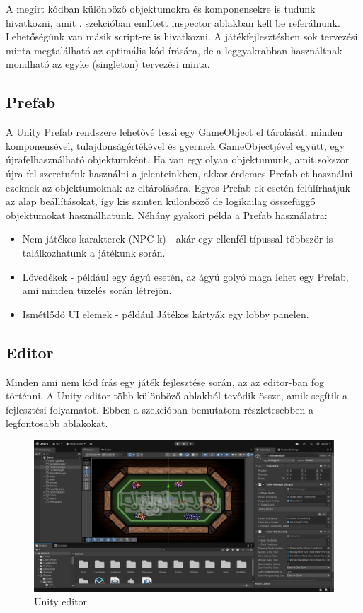 \documentclass[]{thesis-ekf}
\theoremstyle{definition}
\theoremstyle{remark}
\begin{document}
A megírt kódban különböző objektumokra és komponensekre is tudunk hivatkozni, amit . szekcióban említett inspector ablakban kell be referálnunk. Lehetőségünk van másik script-re is hivatkozni. A játékfejlesztésben sok tervezési minta megtalálható az optimális kód írására, de a leggyakrabban használtnak mondható az egyke (singleton) tervezési minta. \cite{UnityScripting}

\subsection{Prefab}
A Unity Prefab rendszere lehetővé teszi egy GameObject el tárolását, minden komponensével, tulajdonságértékével és gyermek GameObjectjével együtt, egy újrafelhasználható objektumként. Ha van egy olyan objektumunk, amit sokszor újra fel szeretnénk használni a jelenteinkben, akkor érdemes Prefab-et használni ezeknek az objektumoknak az eltárolására. Egyes Prefab-ek esetén felülírhatjuk az alap beállításokat, így kis szinten különböző de logikailag összefüggő objektumokat használhatunk. Néhány gyakori példa a Prefab használatra: \cite{UnityPrefab}

\begin{itemize}
	\item Nem játékos karakterek (NPC-k) - akár egy ellenfél típussal többször is találkozhatunk a játékunk során.
	\item Lövedékek - például egy ágyú esetén, az ágyú golyó maga lehet egy Prefab, ami minden tüzelés során létrejön.
	\item Ismétlődő UI elemek - például Játékos kártyák egy lobby panelen.
\end{itemize}

\subsection{Editor}
\label{subsec-editor}
Minden ami nem kód írás egy játék fejlesztése során, az az editor-ban fog történni. A Unity editor több különböző ablakból tevődik össze, amik segítik a fejlesztési folyamatot. Ebben a szekcióban bemutatom részletesebben a legfontosabb ablakokat.

\begin{figure}[ht!]
	\centering
	\includegraphics[width=16cm]{UnityEditor}
	\caption{Unity editor}
	\label{fig-unityeditor}
\end{figure}
\end{document}
